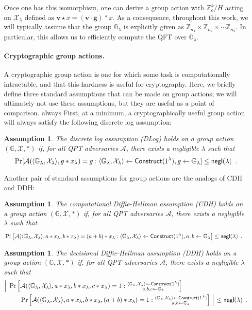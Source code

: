 \documentclass{article}\usepackage[a4paper,margin=20mm]{geometry}
\newtheorem{assumption}[theorem]{Assumption}
\numberwithin{theorem}{section}
\numberwithin{equation}{section}
\newcommand{\Z}{\mathbb{Z}}
\newcommand{\G}{\mathbb{G}}
\newcommand{\gv}{{\mathbf{g}}}
\providecommand{\vv}{}\renewcommand{\vv}{{\mathbf{v}}}
\newcommand{\As}{{\mathcal{A}}}
\newcommand{\Xs}{{\mathcal{X}}}
\newcommand{\negl}{{\sf negl}}
\begin{document}
Once one has this isomorphism, one can derive a group action with $\Z_o^k/H$ acting on $\Xs_\lambda$ defined as $\vv\star x=(\vv\cdot\gv)*x$. As a consequence, throughout this work, we will typically assume that the group $\G_\lambda$ is explicitly given as $\Z_{n_1}\times \Z_{n_2}\times\cdots\Z_{n_k}$. In particular, this allows us to efficiently compute the QFT over $\G_\lambda$.




\paragraph{Cryptographic group actions.} A cryptographic group action is one for which some task is computationally intractable, and that this hardness is useful for cryptography. Here, we briefly define three standard assumptions that can be made on group actions; we will ultimately not use these assumptions, but they are useful as a point of comparison.
always
First, at a minimum, a cryptographically useful group action will always satisfy the following discrete log assumption:
\begin{assumption}\label{def:dlog} The \emph{discrete log assumption} (DLog) holds on a group action $(\G,\Xs,*)$ if, for all QPT adversaries $\As$, there exists a negligible $\lambda$ such that 
	\[\Pr[\As(\langle\G_\lambda,\Xs_\lambda\rangle,g*x_\lambda)=g:\langle\G_\lambda,\Xs_\lambda\rangle\gets{\sf Construct}(1^\lambda), g\gets\G_\lambda]\leq\negl(\lambda)\enspace .\]
\end{assumption}
\noindent Another pair of standard assumptions for group actions are the analogs of CDH and DDH:
\begin{assumption}\label{def:cdh} The \emph{computational Diffie-Hellman assumption} (CDH) holds on a group action $(\G,\Xs,*)$ if, for all QPT adversaries $\As$, there exists a negligible $\lambda$ such that 
 	\begin{align*}&\Pr\left[\As(\langle\G_\lambda,\Xs_\lambda\rangle,a*x_\lambda,b*x_\lambda)=(a+b)*x_\lambda: \langle\G_\lambda,\Xs_\lambda\rangle\gets{\sf Construct}(1^\lambda),a,b\gets\G_\lambda\right]\leq\negl(\lambda)\enspace .\end{align*}
\end{assumption}
\begin{assumption}\label{def:ddh} The \emph{decisional Diffie-Hellman assumption} (DDH) holds on a group action $(\G,\Xs,*)$ if, for all QPT adversaries $\As$, there exists a negligible $\lambda$ such that 
	\begin{align*}&\Big|\;\Pr\left[\As(\langle\G_\lambda,\Xs_\lambda\rangle,a*x_\lambda,b*x_\lambda,c*x_\lambda)=1: \substack{\langle\G_\lambda,\Xs_\lambda\rangle\gets{\sf Construct}(1^\lambda)\\a,b,c\gets\G_\lambda}\right]\\&\;\;\;\;\;-\Pr\left[\As(\langle\G_\lambda,\Xs_\lambda\rangle,a*x_\lambda,b*x_\lambda,(a+b)*x_\lambda)=1: \substack{\langle\G_\lambda,\Xs_\lambda\rangle\gets{\sf Construct}(1^\lambda)\\a,b\gets\G_\lambda}\right]\;\Big|\leq\negl(\lambda)\enspace .\end{align*}
\end{assumption}
\end{document}
